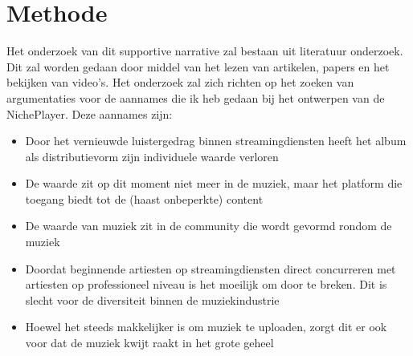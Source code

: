 \section{Methode}

Het onderzoek van dit supportive narrative zal bestaan uit literatuur onderzoek. Dit zal worden gedaan door middel van het lezen van artikelen, papers en het bekijken van video's.
Het onderzoek zal zich richten op het zoeken van argumentaties voor de aannames die ik heb gedaan bij het ontwerpen van de NichePlayer. Deze aannames zijn:

\begin{itemize}
  \item Door het vernieuwde luistergedrag binnen streamingdiensten heeft het album als distributievorm zijn individuele waarde verloren
  \item De waarde zit op dit moment niet meer in de muziek, maar het platform die toegang biedt tot de (haast onbeperkte) content
  \item De waarde van muziek zit in de community die wordt gevormd rondom de muziek
  \item Doordat beginnende artiesten op streamingdiensten direct concurreren met artiesten op professioneel niveau is het moeilijk om door te breken. Dit is slecht voor de diversiteit binnen de muziekindustrie
  \item Hoewel het steeds makkelijker is om muziek te uploaden, zorgt dit er ook voor dat de muziek kwijt raakt in het grote geheel
\end{itemize}

